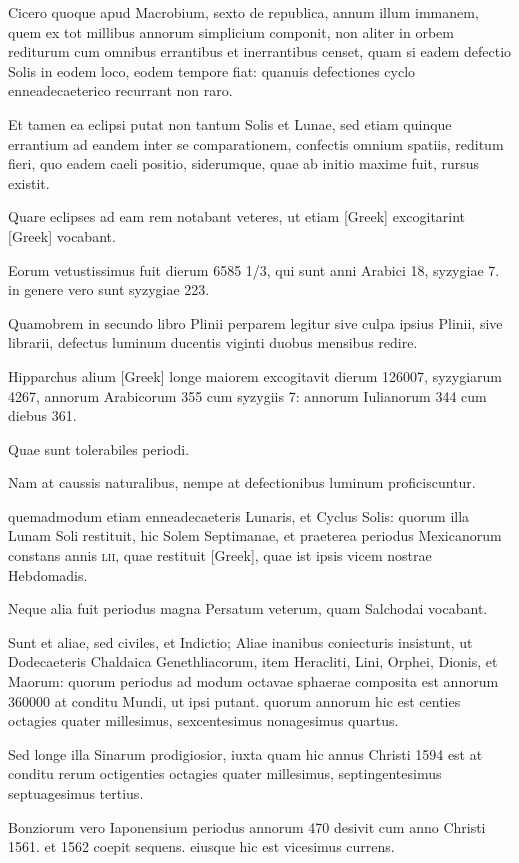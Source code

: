Cicero quoque apud Macrobium,
sexto de republica, annum illum immanem, quem ex tot millibus
annorum simplicium componit, non aliter in orbem rediturum
cum omnibus errantibus et inerrantibus censet, quam si eadem defectio
Solis in eodem loco, eodem tempore fiat: quanuis defectiones
cyclo enneadecaeterico recurrant non raro.

Et tamen ea eclipsi putat
non tantum Solis et Lunae, sed etiam quinque errantium ad eandem
inter se comparationem, confectis omnium spatiis, reditum fieri, quo
eadem caeli positio, siderumque, quae ab initio maxime fuit, rursus existit.

Quare eclipses ad eam rem notabant veteres, ut etiam \textgreek{[Greek]}
excogitarint \textgreek{[Greek]} vocabant.

Eorum vetustissimus fuit
dierum 6585 1/3, qui sunt anni Arabici 18, syzygiae 7. in genere vero
sunt syzygiae 223.

Quamobrem in secundo libro Plinii perparem legitur
sive culpa ipsius Plinii, sive librarii, defectus luminum ducentis
viginti duobus mensibus redire.

Hipparchus alium \textgreek{[Greek]} longe
maiorem excogitavit dierum 126007, syzygiarum 4267, annorum
Arabicorum 355 cum syzygiis 7: annorum Iulianorum 344 cum
diebus 361.

Quae sunt tolerabiles periodi.

Nam at caussis naturalibus,
nempe at defectionibus luminum proficiscuntur.

quemadmodum
etiam enneadecaeteris Lunaris, et Cyclus Solis: quorum illa Lunam
Soli restituit, hic Solem Septimanae, et praeterea periodus Mexicanorum
constans annis \textsc{lii}, quae restituit \textgreek{[Greek]}, quae ist ipsis
vicem nostrae Hebdomadis.

Neque alia fuit periodus magna Persatum
veterum, quam Salchodai vocabant.

Sunt et aliae, sed civiles, et Indictio;
Aliae inanibus coniecturis insistunt, ut Dodecaeteris Chaldaica
Genethliacorum, item Heracliti, Lini, Orphei, Dionis, et Maorum:
quorum periodus ad modum octavae sphaerae composita est annorum
360000 at conditu Mundi, ut ipsi putant. quorum annorum hic est
centies octagies quater millesimus, sexcentesimus nonagesimus quartus.

Sed longe illa Sinarum prodigiosior, iuxta quam hic annus Christi
1594 est at conditu rerum octigenties octagies quater millesimus,
septingentesimus septuagesimus tertius.

Bonziorum vero Iaponensium
periodus annorum 470 desivit cum anno Christi 1561. et 1562
coepit sequens. eiusque hic est vicesimus currens.

